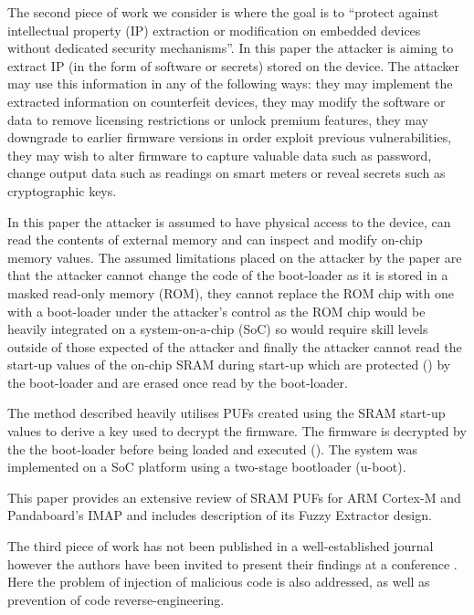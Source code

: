 The second piece of work we consider is \cite{Schaller2014} where the goal is to ``protect against intellectual property (IP) extraction or modification on embedded devices without dedicated security mechanisms''. In this paper the attacker is aiming to extract IP (in the form of software or secrets) stored on the device. The attacker may use this information in any of the following ways: they may implement the extracted information on counterfeit devices, they may modify the software or data to remove licensing restrictions or unlock premium features, they may downgrade to earlier firmware versions  in order exploit previous vulnerabilities, they may wish to alter firmware to capture valuable data such as password, change output data such as readings on smart meters or reveal secrets such as cryptographic keys.

In this paper the attacker is assumed to have physical access to the device, can read the contents of external memory and can inspect and modify on-chip memory values. The assumed limitations placed on the attacker by the paper are that the attacker cannot change the code of the boot-loader as it is stored in a masked read-only memory (ROM), they cannot replace the ROM chip with one with a boot-loader under the attacker's control as the ROM chip would be heavily integrated on a system-on-a-chip (SoC) so would require skill levels outside of those expected of the attacker and finally the attacker cannot read the start-up values of the on-chip SRAM during start-up which are protected () by the boot-loader and are erased once read by the boot-loader.

The method described heavily utilises PUFs created using the SRAM start-up values to derive a key used to decrypt the firmware. The firmware is decrypted by the the boot-loader before being loaded and executed (). The system was implemented on a SoC platform using a two-stage bootloader (u-boot).

This paper provides an extensive review of SRAM PUFs for ARM Cortex-M and Pandaboard's IMAP and includes description of its Fuzzy Extractor design.


 The third piece of work \cite{Kleber2015} has not been published in a well-established journal however the authors have been invited to present their findings at a conference . Here the problem of injection of malicious code is also addressed, as well as prevention of code reverse-engineering.

